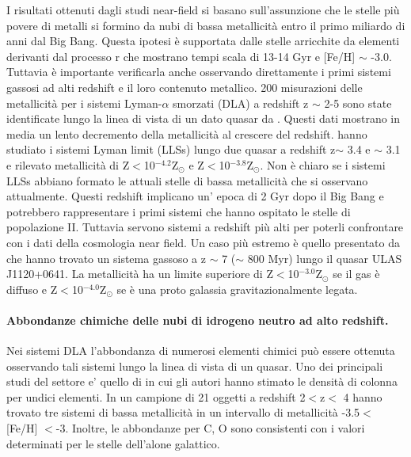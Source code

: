 \documentclass[12pt]{article}
\begin{document}
I risultati ottenuti dagli studi near-field si basano sull’assunzione che le stelle più povere di metalli si formino da nubi di bassa metallicità entro il primo miliardo di anni dal Big Bang. Questa ipotesi è supportata dalle stelle arricchite da elementi derivanti dal processo r che mostrano tempi scala di 13-14 Gyr e [Fe/H] $\sim$ -3.0. 
Tuttavia è importante verificarla anche osservando direttamente i primi sistemi gassosi ad alti redshift e il loro contenuto metallico. 
200 misurazioni delle metallicità per i sistemi Lyman-$\alpha$ smorzati (DLA) a redshift z  $\sim$ 2-5 sono state identificate lungo la linea di vista di un dato quasar da \cite{Rafelski}. Questi dati mostrano in media un lento decremento della metallicità al crescere del redshift. 
\cite{Fumagalli} hanno studiato i sistemi Lyman limit (LLSs) lungo due quasar a redshift z$\sim$ 3.4 e $\sim$ 3.1 e rilevato metallicità di Z$<$10$^{-4.2}$Z$_{\odot}$ e Z$<$10$^{-3.8}$Z$_{\odot}$. Non è chiaro se i sistemi LLSs abbiano formato le attuali stelle di bassa metallicità che si osservano attualmente. 
Questi redshift implicano un’ epoca di 2 Gyr dopo il Big Bang e potrebbero rappresentare i primi sistemi che hanno ospitato le stelle di popolazione II. Tuttavia servono sistemi a redshift più alti per poterli confrontare con i dati della cosmologia near field.  
Un caso più estremo è quello presentato da \cite{Simcoe} che hanno trovato un sistema gassoso a z $\sim$ 7 ($\sim$ 800 Myr) lungo il quasar ULAS J1120+0641. La metallicità ha un limite superiore di Z$<$10$^{-3.0}$Z$_{\odot}$ se il gas è diffuso e Z$<$10$^{-4.0}$Z$_{\odot}$ se è una proto galassia gravitazionalmente legata.

\paragraph{Abbondanze chimiche delle nubi di idrogeno neutro ad alto redshift.}

Nei sistemi DLA l’abbondanza di numerosi elementi chimici può essere ottenuta osservando tali sistemi lungo la linea di vista di un quasar. Uno dei principali studi del settore e' quello di \cite{Cooke_2011} in cui gli autori hanno stimato le densità di colonna per undici elementi. In un campione di 21 oggetti a redshift 2$<$z$<$ 4 hanno trovato tre sistemi di bassa metallicità in un intervallo di metallicità -3.5$<$[Fe/H] $<$-3. Inoltre, le abbondanze per C, O sono consistenti con i valori determinati per le stelle dell’alone galattico.
\end{document}
